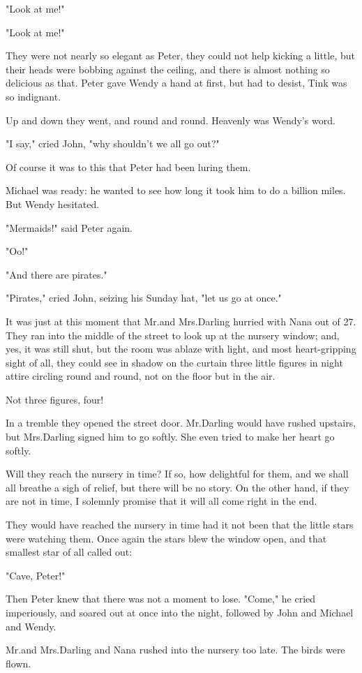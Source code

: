 "Look at me!"

"Look at me!"

They were not nearly so elegant as Peter, they could not help kicking a little, but their heads were bobbing against the ceiling, and there is almost nothing so delicious as that.
Peter gave Wendy a hand at first, but had to desist, Tink was so indignant.

Up and down they went, and round and round.
Heavenly was Wendy's word.

"I say," cried John, "why shouldn't we all go out?"

Of course it was to this that Peter had been luring them.

Michael was ready:
he wanted to see how long it took him to do a billion miles.
But Wendy hesitated.

"Mermaids!\@" said Peter again.

"Oo!"

"And there are pirates."

"Pirates," cried John, seizing his Sunday hat, "let us go at once."

It was just at this moment that Mr.\@ and Mrs.\@ Darling hurried with Nana out of 27.
They ran into the middle of the street to look up at the nursery window;
and, yes, it was still shut, but the room was ablaze with light, and most heart-gripping sight of all, they could see in shadow on the curtain three little figures in night attire circling round and round, not on the floor but in the air.

Not three figures, four!

In a tremble they opened the street door.
Mr.\@ Darling would have rushed upstairs, but Mrs.\@ Darling signed him to go softly.
She even tried to make her heart go softly.

Will they reach the nursery in time?
If so, how delightful for them, and we shall all breathe a sigh of relief, but there will be no story.
On the other hand, if they are not in time, I solemnly promise that it will all come right in the end.

They would have reached the nursery in time had it not been that the little stars were watching them.
Once again the stars blew the window open, and that smallest star of all called out:

"Cave, Peter!"

Then Peter knew that there was not a moment to lose.
"Come," he cried imperiously, and soared out at once into the night, followed by John and Michael and Wendy.

Mr.\@ and Mrs.\@ Darling and Nana rushed into the nursery too late.
The birds were flown.
